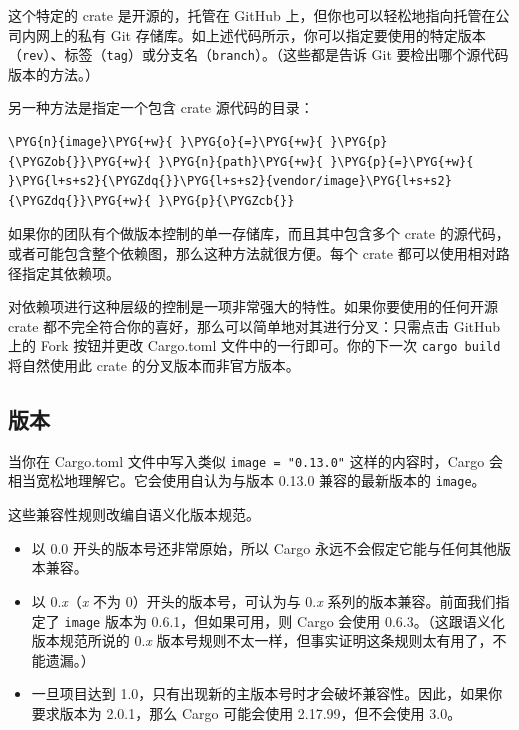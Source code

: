 这个特定的 crate 是开源的，托管在 GitHub 上，但你也可以轻松地指向托管在公司内网上的私有 Git 存储库。如上述代码所示，你可以指定要使用的特定版本（\texttt{rev}）、标签（\texttt{tag}）或分支名（\texttt{branch}）。（这些都是告诉 Git 要检出哪个源代码版本的方法。）

另一种方法是指定一个包含 crate 源代码的目录：

\begin{Verbatim}[commandchars=\\\{\},breaklines=true,breakanywhere=true,fontsize=\codefont,xleftmargin=17bp]
\PYG{n}{image}\PYG{+w}{ }\PYG{o}{=}\PYG{+w}{ }\PYG{p}{\PYGZob{}}\PYG{+w}{ }\PYG{n}{path}\PYG{+w}{ }\PYG{p}{=}\PYG{+w}{ }\PYG{l+s+s2}{\PYGZdq{}}\PYG{l+s+s2}{vendor/image}\PYG{l+s+s2}{\PYGZdq{}}\PYG{+w}{ }\PYG{p}{\PYGZcb{}}
\end{Verbatim}

如果你的团队有个做版本控制的单一存储库，而且其中包含多个 crate 的源代码，或者可能包含整个依赖图，那么这种方法就很方便。每个 crate 都可以使用相对路径指定其依赖项。

对依赖项进行这种层级的控制是一项非常强大的特性。如果你要使用的任何开源 crate 都不完全符合你的喜好，那么可以简单地对其进行分叉：只需点击 GitHub 上的 Fork 按钮并更改 Cargo.toml 文件中的一行即可。你的下一次 \texttt{cargo build} 将自然使用此 crate 的分叉版本而非官方版本。

\subsection{版本}

当你在 Cargo.toml 文件中写入类似 \texttt{image = "0.13.0"} 这样的内容时，Cargo 会相当宽松地理解它。它会使用自认为与版本 0.13.0 兼容的最新版本的 \texttt{image}。

这些兼容性规则改编自语义化版本规范。

\begin{itemize}
\item 以 0.0 开头的版本号还非常原始，所以 Cargo 永远不会假定它能与任何其他版本兼容。
\item 以 0.\emph{x}（\emph{x} 不为 0）开头的版本号，可认为与 0.\emph{x} 系列的版本兼容。前面我们指定了 \texttt{image} 版本为 0.6.1，但如果可用，则 Cargo 会使用 0.6.3。（这跟语义化版本规范所说的 0.\emph{x} 版本号规则不太一样，但事实证明这条规则太有用了，不能遗漏。）
\item 一旦项目达到 1.0，只有出现新的主版本号时才会破坏兼容性。因此，如果你要求版本为 2.0.1，那么 Cargo 可能会使用 2.17.99，但不会使用 3.0。
\end{itemize}

